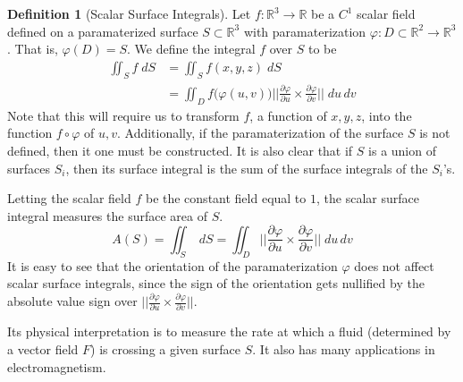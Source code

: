\documentclass{article}
\theoremstyle{remark}
\theoremstyle{definition}
\newtheorem{definition}{Definition}[section]
\begin{document}
\begin{definition}[Scalar Surface Integrals]
Let $f: \mathbb{R}^3 \longrightarrow \mathbb{R}$ be a $C^1$ scalar field defined on a paramaterized surface $S \subset \mathbb{R}^3$ with paramaterization $\varphi: D \subset \mathbb{R}^2 \longrightarrow \mathbb{R}^3$. That is, $\varphi(D) = S$. We define the integral $f$ over $S$ to be
\begin{align*}
    \iint_S f \; dS & = \iint_S f(x, y, z) \; dS \\
    & = \iint_D f\big( \varphi(u, v)\big) \bigg|\bigg|\frac{\partial \varphi}{\partial u} \times \frac{\partial \varphi}{\partial v}\bigg|\bigg| \; du \,dv
\end{align*}
Note that this will require us to transform $f$, a function of $x, y, z$, into the function $f \circ \varphi$ of $u, v$. Additionally, if the paramaterization of the surface $S$ is not defined, then it one must be constructed. It is also clear that if $S$ is a union of surfaces $S_i$, then its surface integral is the sum of the surface integrals of the $S_i$'s. 
\end{definition}

Letting the scalar field $f$ be the constant field equal to $1$, the scalar surface integral measures the surface area of $S$. 
\[A(S) = \iint_S \; dS = \iint_D \Big|\Big|\frac{\partial \varphi}{\partial u} \times \frac{\partial \varphi}{\partial v}\Big|\Big| \; du\, dv\]
It is easy to see that the orientation of the paramaterization $\varphi$ does not affect scalar surface integrals, since the sign of the orientation gets nullified by the absolute value sign over $||\frac{\partial \varphi}{\partial u} \times \frac{\partial \varphi}{\partial v}||$. 

Its physical interpretation is to measure the rate at which a fluid (determined by a vector field $F$) is crossing a given surface $S$. It also has many applications in electromagnetism. 
\end{document}

